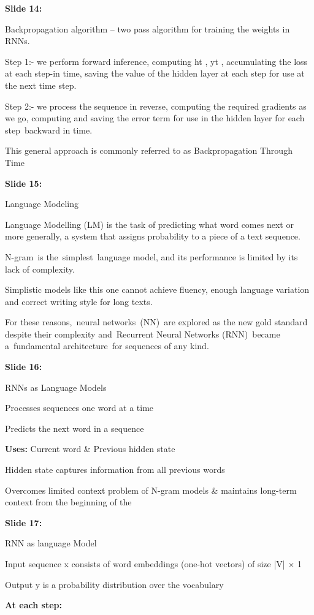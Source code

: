 \documentclass[11pt,a4paper]{article}
\begin{document}
\textbf{Slide 14:}

Backpropagation algorithm – two pass algorithm for training the weights in RNNs.

Step 1:- we perform forward inference, computing ht , yt , accumulating the loss at each step-in time, saving thevalue of the hidden layer at each step for use at the next time step.

Step 2:- we process the sequence in reverse, computing the required gradients as we go, computing and saving the error term for use in the hidden layer for each step backward in time.

This general approach is commonly referred to as Backpropagation Through Time

\textbf{Slide 15:}

Language Modeling

Language Modelling (LM) is the task of predicting what word comes next or more generally, a system that assigns probability to a piece of a text sequence.

N-gram is the simplest language model, and its performance is limited by its lack of complexity.

Simplistic models like this one cannot achieve fluency, enough language variation and correct writing style for long texts.

For these reasons, neural networks (NN) are explored as the new gold standard despite their complexity and Recurrent Neural Networks (RNN) became a fundamental architecture for sequences of any kind.

\textbf{Slide 16:}

RNNs as Language Models

Processes sequences one word at a time

Predicts the next word in a sequence

\textbf{Uses:}  Current word \& Previous hidden state

Hidden state captures information from all previous words

Overcomes limited context problem of N-gram models & maintains long-term context from the beginning of the

\textbf{Slide 17:}

RNN as language Model

Input sequence x consists of word embeddings (one-hot vectors) of size |V| × 1

Output y is a probability distribution over the vocabulary

\textbf{At each step:} 
\end{document}
